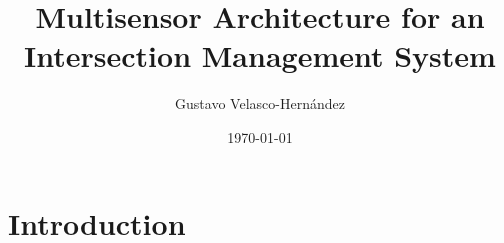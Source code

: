 \documentclass{paper}
\begin{document}
\title{Multisensor Architecture for an Intersection Management System}
\author{Gustavo Velasco-Hernández}
\date{\today}
\maketitle


%
\section{Introduction}

%



%
\end{document}
